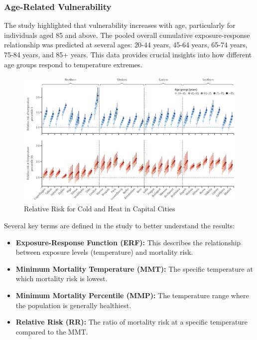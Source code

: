 \documentclass[
]{krantz}
\providecommand{\tightlist}{%
  \setlength{\itemsep}{0pt}\setlength{\parskip}{0pt}}
\begin{document}
\subsubsection{Age-Related Vulnerability}\label{age-related-vulnerability}

The study highlighted that vulnerability increases with age, particularly for individuals aged 85 and above. The pooled overall cumulative exposure-response relationship was predicted at several ages: 20-44 years, 45-64 years, 65-74 years, 75-84 years, and 85+ years. This data provides crucial insights into how different age groups respond to temperature extremes.

\begin{figure}
\centering
\includegraphics{work/09-epidemiologic/figures/Bild2.png}
\caption{Relative Risk for Cold and Heat in Capital Cities}
\end{figure}

Several key terms are defined in the study to better understand the results:

\begin{itemize}
\tightlist
\item
  \textbf{Exposure-Response Function (ERF):} This describes the relationship between exposure levels (temperature) and mortality risk.
\item
  \textbf{Minimum Mortality Temperature (MMT):} The specific temperature at which mortality risk is lowest.
\item
  \textbf{Minimum Mortality Percentile (MMP):} The temperature range where the population is generally healthiest.
\item
  \textbf{Relative Risk (RR):} The ratio of mortality risk at a specific temperature compared to the MMT.
\end{itemize}
\end{document}
